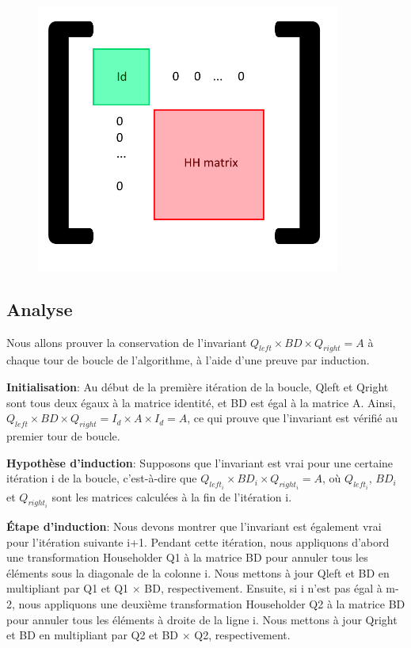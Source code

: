 \documentclass{article}
\begin{document}
\begin{figure}
  \label{img:pad_HH}
  \centering
  \includegraphics[width=10cm]{../files/hh_padded.png}
\end{figure}

\subsection{Analyse}
\label{ssec:analyse_bidiag}

Nous allons prouver la conservation de l'invariant $Q_{left} \times BD \times Q_{right} = A$ 
à chaque tour de boucle de l'algorithme, à l'aide d'une preuve par induction.

\textbf{Initialisation}: Au début de la première itération de la boucle, 
Qleft et Qright sont tous deux égaux à la matrice identité, et BD est égal à la matrice A. 
Ainsi, $Q_{left} \times BD \times Q_{right} = I_d \times A \times I_d = A$, 
ce qui prouve que l'invariant est vérifié au premier tour de boucle.

\textbf{Hypothèse d'induction}: Supposons que l'invariant est vrai pour une certaine itération i de la boucle,
c'est-à-dire que $Q_{left_i} \times BD_i \times Q_{right_i} = A$, où $Q_{left_i}$, $BD_i$ et $Q_{right_i}$
sont les matrices calculées à la fin de l'itération i.

\textbf{Étape d'induction}: Nous devons montrer que l'invariant est également vrai pour l'itération suivante i+1. 
Pendant cette itération, nous appliquons d'abord une transformation Householder Q1 à la matrice BD pour annuler 
tous les éléments sous la diagonale de la colonne i. Nous mettons à jour Qleft et BD en multipliant par Q1 et Q1 $\times$ BD, respectivement. 
Ensuite, si i n'est pas égal à m-2, nous appliquons une deuxième transformation Householder Q2 à la matrice BD 
pour annuler tous les éléments à droite de la ligne i. Nous mettons à jour Qright et BD en multipliant par Q2 et BD $\times$ Q2, respectivement.
\end{document}
